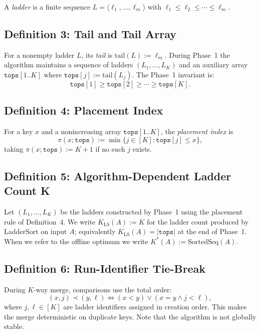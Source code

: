 \documentclass[12pt,a4paper]{article}
\theoremstyle{plain}
\theoremstyle{definition}
\begin{document}
A \emph{ladder} is a finite sequence $L = \langle \ell_1, \ldots, \ell_m \rangle$ with $\ell_1 \leq \ell_2 \leq \cdots \leq \ell_m$.
 
\subsection{Definition 3: Tail and Tail Array}
 
For a nonempty ladder $L$, its \emph{tail} is $\mathrm{tail}(L) := \ell_m$. During Phase~1 the algorithm maintains a sequence of ladders $(L_1,\ldots,L_K)$ and an auxiliary array $\mathtt{tops}[1..K]$ where $\mathtt{tops}[j] := \mathrm{tail}(L_j)$. The Phase~1 invariant is:
\[
  \mathtt{tops}[1] \geq \mathtt{tops}[2] \geq \cdots \geq \mathtt{tops}[K].
\]
 
\subsection{Definition 4: Placement Index}
 
For a key $x$ and a nonincreasing array $\mathtt{tops}[1..K]$, the \emph{placement index} is
\[
  \pi(x;\mathtt{tops}) := \min\bigl\{j \in [K] : \mathtt{tops}[j] \leq x\bigr\},
\]
taking $\pi(x;\mathtt{tops}) := K+1$ if no such $j$ exists.
 
\subsection{Definition 5: Algorithm-Dependent Ladder Count K}
 
Let $(L_1,\ldots,L_K)$ be the ladders constructed by Phase~1 using the placement rule of Definition~4. We write $K_{\mathrm{LS}}(A) := K$ for the ladder count produced by LadderSort on input $A$; equivalently $K_{\mathrm{LS}}(A) = |\mathtt{tops}|$ at the end of Phase~1. When we refer to the offline optimum we write $K^*(A) := \mathrm{SortedSeq}(A)$.
 
\subsection{Definition 6: Run-Identifier Tie-Break}
 
During $K$-way merge, comparisons use the total order:
\[
  (x,j) \prec (y,\ell) \iff (x < y) \vee (x = y \wedge j < \ell),
\]
where $j, \ell \in [K]$ are ladder identifiers assigned in creation order. This makes the merge deterministic on duplicate keys. Note that the algorithm is not globally stable.
 
\end{document}
